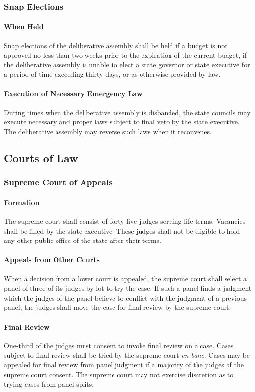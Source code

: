 \documentclass{article}
\begin{document}
\subsubsection{Snap Elections}
\paragraph{When Held}
Snap elections of the deliberative assembly shall be held if a budget is not approved no less than two weeks prior to the expiration of the current budget, if the deliberative assembly is unable to elect a state governor or state executive for a period of time exceeding thirty days, or as otherwise provided by law.
\paragraph{Execution of Necessary Emergency Law}
During times when the deliberative assembly is disbanded, the state councils may execute necessary and proper laws subject to final veto by the state executive. The deliberative assembly may reverse such laws when it reconvenes.
\newpage
\subsection{Courts of Law}
\subsubsection{Supreme Court of Appeals}
\paragraph{Formation}
The supreme court shall consist of forty-five judges serving life terms. Vacancies shall be filled by the state executive. These judges shall not be eligible to hold any other public office of the state after their terms.
\paragraph{Appeals from Other Courts}
When a decision from a lower court is appealed, the supreme court shall select a panel of three of its judges by lot to try the case. If such a panel finds a judgment which the judges of the panel believe to conflict with the judgment of a previous panel, the judges shall move the case for final review by the supreme court.
\paragraph{Final Review}
One-third of the judges must consent to invoke final review on a case. Cases subject to final review shall be tried by the supreme court \textit{en banc}. Cases may be appealed for final review from panel judgment if a majority of the judges of the supreme court consent. The supreme court may not exercise discretion as to trying cases from panel splits.
\end{document}
